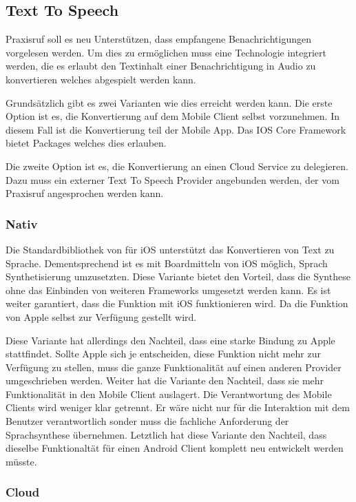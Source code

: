 \subsection{Text To Speech}

Praxisruf soll es neu Unterstützen, dass empfangene Benachrichtigungen vorgelesen werden.
Um dies zu ermöglichen muss eine Technologie integriert werden, die es erlaubt den Textinhalt einer Benachrichtigung
in Audio zu konvertieren welches abgespielt werden kann.

Grundsätzlich gibt es zwei Varianten wie dies erreicht werden kann.
Die erste Option ist es, die Konvertierung auf dem Mobile Client selbst vorzunehmen.
In diesem Fall ist die Konvertierung teil der Mobile App.
Das IOS Core Framework bietet Packages welches dies erlauben.

Die zweite Option ist es, die Konvertierung an einen Cloud Service zu delegieren.
Dazu muss ein externer Text To Speech Provider angebunden werden, der vom Praxisruf angesprochen werden kann.

\subsubsection{Nativ}

Die Standardbibliothek von für iOS unterstützt das Konvertieren von Text zu Sprache.\cite{ios_speech_synthesis}
Dementsprechend ist es mit Boardmitteln von iOS möglich, Sprach Synthetisierung umzusetzten.
Diese Variante bietet den Vorteil, dass die Synthese ohne das Einbinden von weiteren Frameworks umgesetzt werden kann.
Es ist weiter garantiert, dass die Funktion mit iOS funktionieren wird.
Da die Funktion von Apple selbst zur Verfügung gestellt wird.

Diese Variante hat allerdings den Nachteil, dass eine starke Bindung zu Apple stattfindet.
Sollte Apple sich je entscheiden, diese Funktion nicht mehr zur Verfügung zu stellen, muss die ganze Funktionalität
auf einen anderen Provider umgeschrieben werden.
Weiter hat die Variante den Nachteil, dass sie mehr Funktionalität in den Mobile Client auslagert.
Die Verantwortung des Mobile Clients wird weniger klar getrennt.
Er wäre nicht nur für die Interaktion mit dem Benutzer verantwortlich sonder muss die fachliche Anforderung der Sprachsynthese übernehmen.
Letztlich hat diese Variante den Nachteil, dass dieselbe Funktionaltät für einen Android Client komplett neu entwickelt werden müsste.


\subsubsection{Cloud}

